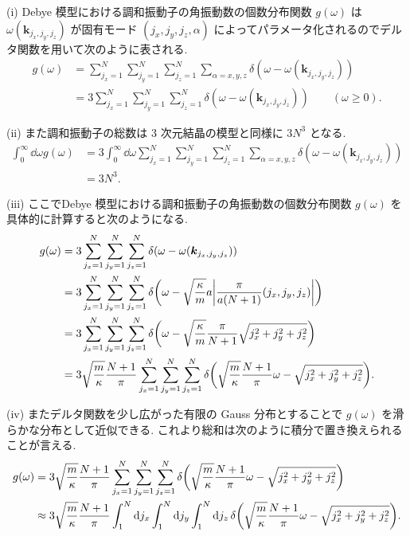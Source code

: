 \documentclass[uplatex,dvipdfmx,a4paper,11pt]{jlreq}
\theoremstyle{definition}
\begin{document}
(i) Debye 模型における調和振動子の角振動数の個数分布関数 $g(\omega)$ は $\omega(\bm{k}_{j_x, j_y, j_z})$ が固有モード $(j_x, j_y, j_z, \alpha)$ によってパラメータ化されるのでデルタ関数を用いて次のように表される.
\begin{align}
  g(\omega) & = \sum_{j_x=1}^{N}\sum_{j_y=1}^{N}\sum_{j_z=1}^{N}\sum_{\alpha=x,y,z}\delta(\omega - \omega(\bm{k}_{j_x,j_y,j_z}))      \\
            & = 3\sum_{j_x=1}^{N}\sum_{j_y=1}^{N}\sum_{j_z=1}^{N}\delta(\omega - \omega(\bm{k}_{j_x,j_y,j_z})) \qquad (\omega\geq 0).
\end{align}

(ii) また調和振動子の総数は 3 次元結晶の模型と同様に $3N^3$ となる.
\begin{align}
  \int_0^\infty\dd{\omega}g(\omega) & = 3\int_0^\infty\dd{\omega}\sum_{j_x=1}^{N}\sum_{j_y=1}^{N}\sum_{j_z=1}^{N}\sum_{\alpha=x,y,z}\delta(\omega - \omega(\bm{k}_{j_x,j_y,j_z})) \\
                                    & = 3N^3.
\end{align}

(iii) ここでDebye 模型における調和振動子の角振動数の個数分布関数 $g(\omega)$ を具体的に計算すると次のようになる.
\begin{align}
  g(\omega) & = 3\sum_{j_x=1}^{N}\sum_{j_y=1}^{N}\sum_{j_z=1}^{N}\delta(\omega - \omega(\bm{k}_{j_x,j_y,j_z}))                                                                                  \\
            & = 3\sum_{j_x=1}^{N}\sum_{j_y=1}^{N}\sum_{j_z=1}^{N}\delta\qty(\omega - \sqrt{\frac{\kappa}{m}}a\qty|\frac{\pi}{a(N+1)}(j_x,j_y,j_z)|)                                             \\
            & = 3\sum_{j_x=1}^{N}\sum_{j_y=1}^{N}\sum_{j_z=1}^{N}\delta\qty(\omega - \sqrt{\frac{\kappa}{m}}\frac{\pi}{N+1}\sqrt{j_x^2 + j_y^2 + j_z^2})                                        \\
            & = 3\sqrt{\frac{m}{\kappa}}\frac{N+1}{\pi}\sum_{j_x=1}^{N}\sum_{j_y=1}^{N}\sum_{j_z=1}^{N}\delta\qty(\sqrt{\frac{m}{\kappa}}\frac{N+1}{\pi}\omega - \sqrt{j_x^2 + j_y^2 + j_z^2}).
\end{align}

(iv) またデルタ関数を少し広がった有限の Gauss 分布とすることで $g(\omega)$ を滑らかな分布として近似できる. これより総和は次のように積分で置き換えられることが言える.
\begin{align}
  g(\omega) & = 3\sqrt{\frac{m}{\kappa}}\frac{N+1}{\pi}\sum_{j_x=1}^{N}\sum_{j_y=1}^{N}\sum_{j_z=1}^{N}\delta\qty(\sqrt{\frac{m}{\kappa}}\frac{N+1}{\pi}\omega - \sqrt{j_x^2 + j_y^2 + j_z^2})                    \\
            & \approx 3\sqrt{\frac{m}{\kappa}}\frac{N+1}{\pi}\int_{1}^{N}\dd{j_x}\int_{1}^{N}\dd{j_y}\int_{1}^{N}\dd{j_z}\delta\qty(\sqrt{\frac{m}{\kappa}}\frac{N+1}{\pi}\omega - \sqrt{j_x^2 + j_y^2 + j_z^2}).
\end{align}
\end{document}
